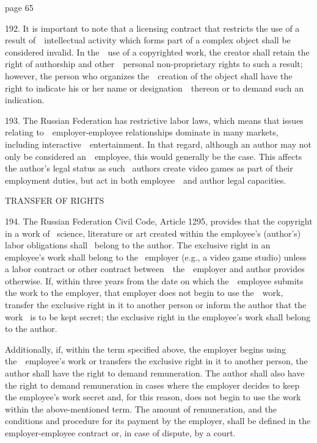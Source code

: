 \documentclass[
]{article}
\begin{document}
{page 65}

{192. }{It is important to note that a licensing contract that restricts
the use of a result of~~intellectual activity which forms part of a
complex object shall be considered invalid. In the~~use of a copyrighted
work, the creator shall retain the right of authorship and
other~~personal non-proprietary rights to such a result; however, the
person who organizes the~~creation of the object shall have the right to
indicate his or her name or designation~~thereon or to demand such an
indication.}

{193. }{The Russian Federation has restrictive labor laws, which means
that issues relating to~~employer-employee relationships dominate in
many markets, including interactive~~entertainment. In that regard,
although an author may not only be considered an~~employee, this would
generally be the case. }{This affects the author's legal status as such
}{~authors create video games as part of their employment duties, but
act in both employee~~and author legal capacities.}

{TRANSFER OF RIGHTS}

{194. }{The Russian Federation }{Civil Code}{, Article 1295, provides
that the copyright in a work of }{~science, literature or art created
within the employee's (author's) labor obligations shall }{~belong to
the author. }{The exclusive right in an employee's work shall belong to
the }{~employer (e.g., a video game studio) unless a labor contract or
other contract between~~the~~employer and author provides otherwise. If,
within three years from the date on which the~~employee submits the work
to the employer, that employer does not begin to use the~~work, transfer
the exclusive right in it to another person or inform the author that
the work }{~is to be kept secret; the exclusive right in the employee's
work shall belong to the author}{.}

{Additionally, if, within the term specified above, the employer begins
using the~~}{employee's }{work or transfers the exclusive right in it to
another person, the author shall have the right to demand remuneration.
The author shall also have the right to demand remuneration in }{cases
where the employer decides to keep the employee's work s}{ecret and, for
this reason, does not begin to use the work within the above-mentioned
term. The amount of remuneration, and the conditions and procedure for
its payment by the employer, shall be defined in the employer-employee
contract or, in case of dispute, by a court.}
\end{document}
